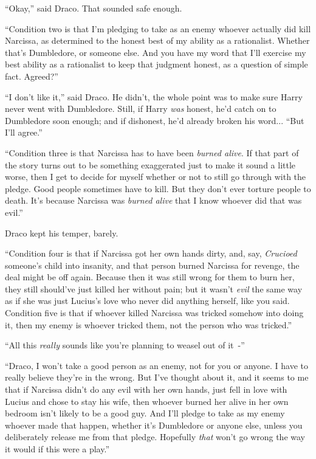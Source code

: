 ``Okay,'' said Draco. That sounded safe enough.

``Condition two is that I'm pledging to take as an enemy whoever actually did kill Narcissa, as determined to the honest best of my ability as a rationalist. Whether that's Dumbledore, or someone else. And you have my word that I'll exercise my best ability as a rationalist to keep that judgment honest, as a question of simple fact. Agreed?''

``I don't like it,'' said Draco. He didn't, the whole point was to make sure Harry never went with Dumbledore. Still, if Harry \emph{was} honest, he'd catch on to Dumbledore soon enough; and if dishonest, he'd already broken his word... ``But I'll agree.''

``Condition three is that Narcissa has to have been \emph{burned alive}. If that part of the story turns out to be something exaggerated just to make it sound a little worse, then I get to decide for myself whether or not to still go through with the pledge. Good people sometimes have to kill. But they don't ever torture people to death. It's because Narcissa was \emph{burned alive} that I know whoever did that was evil.''

Draco kept his temper, barely.

``Condition four is that if Narcissa got her own hands dirty, and, say, \emph{Crucioed} someone's child into insanity, and that person burned Narcissa for revenge, the deal might be off again. Because then it was still wrong for them to burn her, they still should've just killed her without pain; but it wasn't \emph{evil} the same way as if she was just Lucius's love who never did anything herself, like you said. Condition five is that if whoever killed Narcissa was tricked somehow into doing it, then my enemy is whoever tricked them, not the person who was tricked.''

``All this \emph{really} sounds like you're planning to weasel out of it~-''

``Draco, I won't take a good person as an enemy, not for you or anyone. I have to really believe they're in the wrong. But I've thought about it, and it seems to me that if Narcissa didn't do any evil with her own hands, just fell in love with Lucius and chose to stay his wife, then whoever burned her alive in her own bedroom isn't likely to be a good guy. And I'll pledge to take as my enemy whoever made that happen, whether it's Dumbledore or anyone else, unless you deliberately release me from that pledge. Hopefully \emph{that} won't go wrong the way it would if this were a play.''


